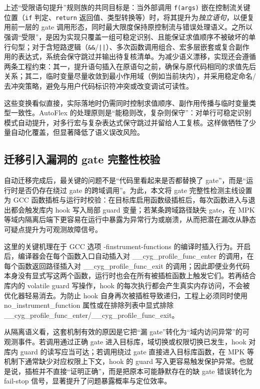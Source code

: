 \documentclass[UTF8,a4paper,12pt,twoside]{ctexart}  %
\begin{document}
上述“受限语句提升”规则族的共同目标是：当外部调用 \texttt{f(args)} 嵌在控制流关键位置（\texttt{if} 判定、\texttt{return} 返回值、类型转换等）时，将其提升为\emph{独立语句}，以便复用前一层的 gate 调用形态，同时最大限度保持原控制流与错误处理语义。之所以强调“受限”，是因为实现只覆盖一组可稳定识别、且能保证求值顺序不被破坏的单行句型；对于含短路逻辑（\texttt{\&\&}/\texttt{||}）、多次函数调用组合、宏多层嵌套或复合副作用的表达式，系统会保守跳过并输出待复核清单。为减少语义漂移，实现还会遵循两条工程约束：其一，提升语句插入在原语句之前，确保与原代码相同的求值先后关系；其二，临时变量尽量收敛到最小作用域（例如当前块内），并采用稳定命名/去冲突策略，避免与用户代码标识符冲突或改变调试可读性。


这些变换看似直接，实际落地时仍需同时控制求值顺序、副作用传播与临时变量类型一致性。AutoFlex
的处理原则是``能稳则改，复杂则保守''：对单行可稳定识别模式自动提升，对多行宏与复杂表达式保守跳过并留给人工复核。这样做牺牲了少量自动化覆盖，但显著降低了语义误改风险。

\subsection{迁移引入漏洞的 gate 完整性校验}

自动迁移完成后，最关键的问题不是``代码里看起来是否都替换了
gate''，而是``运行时是否仍存在绕过 gate 的跨域调用''。为此，本文将 gate
完整性检测主线设置为 GCC
函数插桩与运行时校验：在目标库启用函数级插桩后，每次函数进入与退出都会触发库内
hook 写入局部 guard 变量；若某条跨域路径缺失 gate，在 MPK
等域内隔离后端下更容易在运行中暴露为异常行为或崩溃，从而把潜在漏改从静态可疑点提升为可观测故障信号。

这里的关键机理在于 GCC 选项 -finstrument-functions
的编译时插入行为。开启后，编译器会在每个函数入口自动插入对
\_\_cyg\_profile\_func\_enter 的调用，在每个函数返回路径插入对
\_\_cyg\_profile\_func\_exit
的调用；因此即便业务代码本身没有显式写这两个函数，运行时也会在所有被插桩函数上触发它们。若再结合库内的
volatile guard 写操作，hook
的每次执行都会产生真实内存访问，不会被优化器轻易消去。为防止 hook
自身再次被插桩导致递归，工程上必须同时使用 no\_instrument\_function
属性或在排除列表中显式排除
\_\_cyg\_profile\_func\_enter/\_\_cyg\_profile\_func\_exit。

从隔离语义看，这套机制有效的原因是它把``漏
gate''转化为``域内访问异常''的可观测事件。若调用通过正确 gate
进入目标库，域切换或权限切换已发生，hook 对库内 guard
的读写应当可达；若调用绕过 gate 直接进入目标库函数，在 MPK
等机制下通常缺少对应权限上下文，hook 的 guard
写入更容易触发保护异常。也就是说，插桩并不直接``证明正确''，而是把原本可能静默存在的缺
gate 错误转化为 fail-stop 信号，显著提升了问题暴露概率与定位效率。
\end{document}
